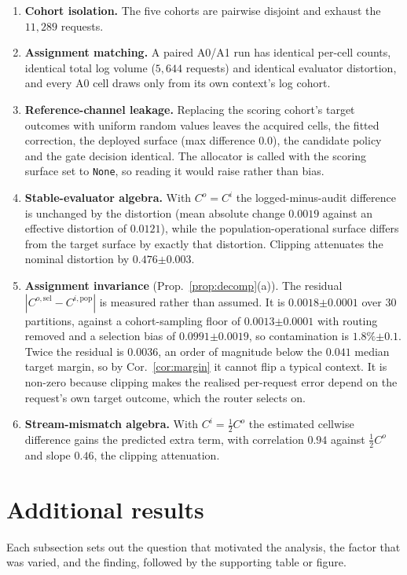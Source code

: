 \documentclass{article}
\theoremstyle{plain}
\theoremstyle{remark}
\newcommand{\se}[1]{{\scriptstyle\pm#1}}
\begin{document}
\begin{enumerate}[leftmargin=1.4em,itemsep=1pt,topsep=2pt]
\item \textbf{Cohort isolation.} The five cohorts are pairwise disjoint and exhaust the $11{,}289$
requests.
\item \textbf{Assignment matching.} A paired A0/A1 run has identical per-cell counts, identical total
log volume ($5{,}644$ requests) and identical evaluator distortion, and every A0 cell draws only from
its own context's log cohort.
\item \textbf{Reference-channel leakage.} Replacing the scoring cohort's target outcomes with uniform
random values leaves the acquired cells, the fitted correction, the deployed surface (max difference
$0.0$), the candidate policy and the gate decision identical. The allocator is called with the scoring
surface set to \texttt{None}, so reading it would raise rather than bias.
\item \textbf{Stable-evaluator algebra.} With $C^o=C^i$ the logged-minus-audit difference is unchanged
by the distortion (mean absolute change $0.0019$ against an effective distortion of $0.0121$), while
the population-operational surface differs from the target surface by exactly that distortion.
Clipping attenuates the nominal distortion by $0.476\se{0.003}$.
\item \textbf{Assignment invariance} (Prop.~\ref{prop:decomp}(a)). The residual
$|C^{o,\mathrm{sel}}-C^{i,\mathrm{pop}}|$ is measured rather than assumed. It is $0.0018\se{0.0001}$
over $30$ partitions, against a cohort-sampling floor of $0.0013\se{0.0001}$ with routing removed and
a selection bias of $0.0991\se{0.0019}$, so contamination is $1.8\%\se{0.1}$. Twice the residual is
$0.0036$, an order of magnitude below the $0.041$ median target margin, so by Cor.~\ref{cor:margin} it
cannot flip a typical context. It is non-zero because clipping makes the realised per-request error
depend on the request's own target outcome, which the router selects on.
\item \textbf{Stream-mismatch algebra.} With $C^i=\tfrac12C^o$ the estimated cellwise difference gains
the predicted extra term, with correlation $0.94$ against $\tfrac12C^o$ and slope $0.46$, the clipping
attenuation.
\end{enumerate}

\section{Additional results}\label{app:extra}
Each subsection sets out the question that motivated the analysis, the factor that was varied, and
the finding, followed by the supporting table or figure.
\end{document}
